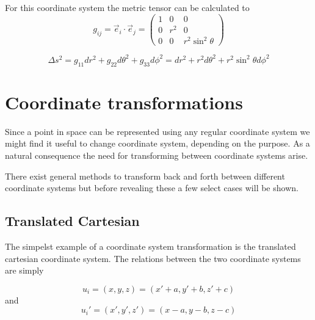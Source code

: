 For this coordinate system the metric tensor can be calculated to 
$$
   g_{ij} = \vec{e}_i\cdot\vec{e}_j  = \left( \begin{array}{ccc}
                    1 & 0 & 0 \\
                    0 & r^2 & 0 \\
                    0 & 0 & r^2\sin^2\theta
                    \end{array} 
             \right)
$$


$$
   \Delta s^2 = g_{11}dr^2 + g_{22}d\theta^2 + g_{33}d\phi^2 = dr^2 + r^2d\theta^2 + r^2\sin^2\theta d\phi^2
$$



\section{Coordinate transformations}

\newcommand{\pyt}{ \sqrt{x^2 + y^2 + z^2} }
Since a point in space can be represented using any regular coordinate system we might find it useful to 
change coordinate system, depending on the purpose. As a natural consequence the need for transforming between coordinate systems arise. 

There exist general methods to transform back and forth between different coordinate systems but
before revealing these a few select cases will be shown.



\subsection{Translated Cartesian}

The simpelst example of a coordinate system transformation is the translated cartesian coordinate system. The
relations between the two coordinate systems are simply

$$
u_i =(x,y,z) = (x' +a, y' + b, z' + c) 
$$
and
$$ 
    u_i'=(x',y',z') = (x -a, y-b, z-c)
$$

